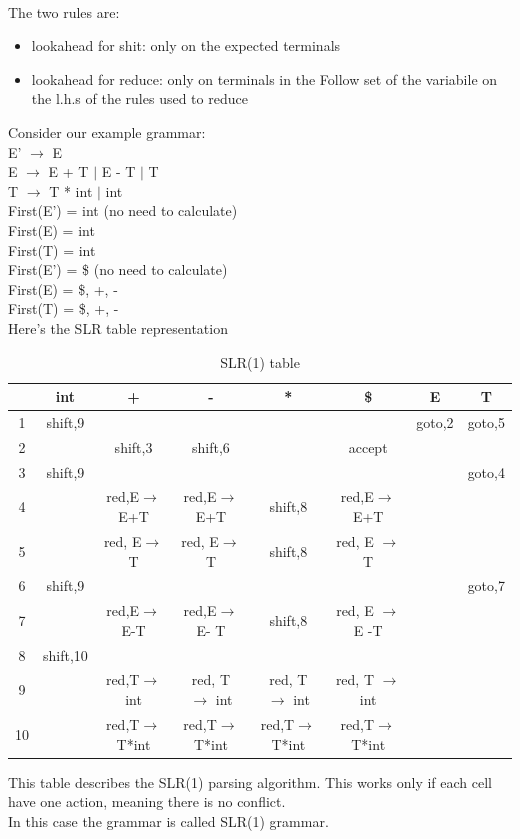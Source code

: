 \documentclass[12pt]{article}
\begin{document}
\\ The two rules are:
\begin{itemize}
    \item lookahead for shit: only on the expected terminals
    \item lookahead for reduce: only on terminals in the Follow set of the variabile on the l.h.s of the rules used to reduce
\end{itemize}
Consider our example grammar: 
\\ E' $\rightarrow$ E 
\\ E $\rightarrow$ E + T $|$ E - T $|$ T
\\ T $\rightarrow$ T * int $|$ int 
\\ First(E') = { int } (no need to calculate) 
\\ First(E) = { int } 
\\ First(T) = { int } 
\\ First(E') = { \$ } (no need to calculate) 
\\ First(E) = { \$, +, - } 
\\ First(T) = { \$, +, - } 
\\ Here's the SLR table representation 
\begin{table}[ht]
	\centering
	\begin{tabular}{|c|c|c|c|c|c|c|c|}
        \hline
        &int &+&-&*&\$&E&T\\ 
        \hline
        1 &shift,9& & && &goto,2&goto,5\\ 
        \hline
        2 &&shift,3&shift,6& &accept& & \\ 
        \hline
        3 &shift,9 & & & & & &goto,4\\ 
        \hline
        4 & &red,\linebreak E$\rightarrow$E+T&red,E$\rightarrow$E+T&shift,8&red,E$\rightarrow$E+T & & \\ 
        \hline
        5 &&red, E$\rightarrow$T& red, E$\rightarrow$T&shift,8&red, E $\rightarrow$ T& & \\ 
        \hline
        6 &shift,9& & & & & &goto,7\\ 
        \hline
        7&&red,E$\rightarrow$E-T&red,E$\rightarrow$E- T  &shift,8&red, E $\rightarrow$ E -T & & \\ 
        \hline
        8 &shift,10& & & & & & \\ 
        \hline
        9 & &red,T$\rightarrow$ int &red, T $\rightarrow$ int &red, T $\rightarrow$ int &red, T $\rightarrow$ int & & \\ 
        \hline
        10 &&red,T$\rightarrow$T*int &red,T$\rightarrow$T*int &red,T$\rightarrow$T*int &red,T$\rightarrow$T*int & & \\ 
        \hline
	\end{tabular}
	\caption{SLR(1) table}
\end{table}
This table describes the SLR(1) parsing algorithm. This works only if each cell have one action, meaning there is no conflict.
\\ In this case the grammar is called SLR(1) grammar.
\end{document}
